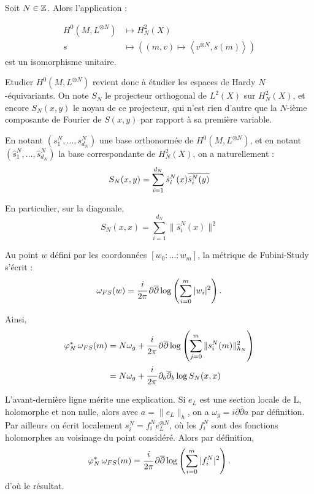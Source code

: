\begin{prop} Soit $N \in \mathbb{Z}$. Alors l'application :

\begin{align*}
	H^0(M,L^{\otimes N}) &\mapsto H^2_N(X) \\
	s &\mapsto \left((m,v) \mapsto \left\langle v^{\otimes N}, s(m)\right\rangle \right)
\end{align*}
est un isomorphisme unitaire.
\end{prop}

Etudier $H^0(M,L^{\otimes N})$ revient donc à étudier les espaces de Hardy $N$-équivariants. On note $S_N$ le projecteur orthogonal de $L^2(X)$ sur $H^2_N(X)$, et encore $S_N(x,y)$ le noyau de ce projecteur, qui n'est rien d'autre que la $N$-ième composante de Fourier de $S(x,y)$ par rapport à sa première variable.

En notant $(s^N_1, \ldots, s^N_{d_N})$ une base orthonormée de $H^0(M,L^{\otimes N})$, et en notant $(\hat{s}^N_1, \ldots, \hat{s}^N_{d_N})$ la base correspondante de $H^2_N(X)$, on a naturellement :
\begin{equation*}
	S_N(x,y)=\sum_{i=1}^{d_N}\hat{s}^N_i(x) \overline{\hat{s}^N_i(y)\strut}
\end{equation*}

En particulier, sur la diagonale,
\begin{equation*}
	S_N(x,x)=\sum_{i=1}^{d_N}\|\hat{s}^N_i(x)\|^2
\end{equation*}

Au point $w$ défini par les coordonnées $[w_0:\ldots:w_m]$, la métrique de Fubini-Study s'écrit :
\begin{equation*}
	\omega_{FS}(w) = \cfrac{i}{2\pi}\,\partial\overline{\partial} \log\left(\sum_{i=0}^m|w_i|^2\right).
\end{equation*}

Ainsi,
\begin{align*}
	\varphi_N^*\,\omega_{FS}(m) &= N \omega_g + \cfrac{i}{2\pi}\,\partial\overline{\partial} \log\left(\sum_{j=0}^m\|s^N_i(m)\|_{h_N}^2\right)\\
	&= N\omega_g + \cfrac{i}{2\pi}\,\partial_b\overline{\partial}_b \log S_N(x,x)
\end{align*}

L'avant-dernière ligne mérite une explication. Si $e_L$ est une section locale de L, holomorphe et non nulle, alors avec $a=\|e_L\|_h$, on a $\omega_g = i \partial \overline{\partial}a$ par définition. Par ailleurs on écrit localement $s^N_i=f_i^Ne_L^{\otimes N}$, où les $f^N_i$ sont des fonctions holomorphes au voisinage du point considéré. Alors par définition, 
\begin{equation*}
	\varphi_N^*\,\omega_{FS}(m) = \cfrac{i}{2\pi}\,\partial\overline{\partial} \log\left(\sum_{i=0}^m|f^N_i|^2\right).
\end{equation*}
d'où le résultat.


